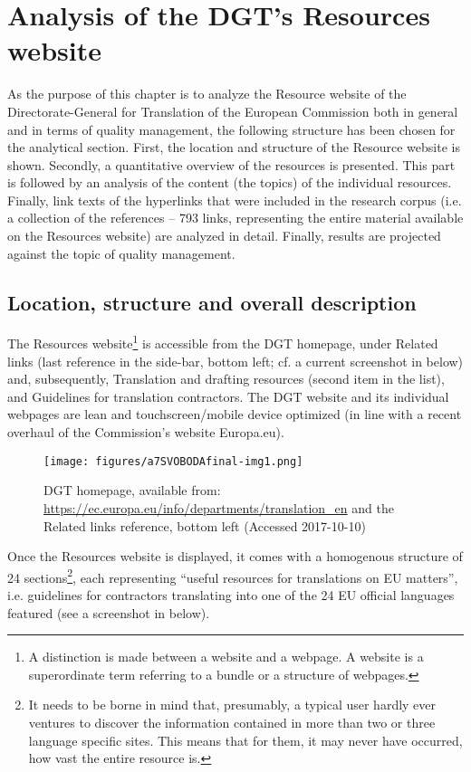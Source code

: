\documentclass[output=paper]{langsci/langscibook}
\begin{document}
\section{Analysis of the DGT’s Resources website}\label{sec:svoboda:4}

As the purpose of this chapter is to analyze the Resource website of the Directorate-General for Translation of the European Commission both in general and in terms of quality management, the following structure has been chosen for the analytical section. First, the location and structure of the Resource website is shown. Secondly, a quantitative overview of the resources is presented. This part is followed by an analysis of the content (the topics) of the individual resources. Finally, link texts of the hyperlinks that were included in the research corpus (i.e. a collection of the references – 793 links, representing the entire material available on the Resources website) are analyzed in detail. Finally, results are projected against the topic of quality management.

\subsection{Location, structure and overall description}\label{sec:svoboda:4.1}

 
The Resources website\footnote{A distinction is made between a website and a webpage. A website is a superordinate term referring to a bundle or a structure of webpages.} is accessible from the DGT homepage, under Related links (last reference in the side-bar, bottom left; cf. a current screenshot in  below) and, subsequently, Translation and drafting resources (second item in the list), and Guidelines for translation contractors. The DGT website and its individual webpages are lean and touchscreen/mobile device optimized (in line with a recent overhaul of the Commission’s website Europa.eu). 

\begin{figure}
\caption{DGT homepage, available from: \url{https://ec.europa.eu/info/departments/translation_en} and the Related links reference, bottom left (Accessed 2017-10-10)}
\label{fig:svoboda:1}
\texttt{[image: figures/a7SVOBODAfinal-img1.png]}
\end{figure}

 

\largerpage
Once the Resources website is displayed, it comes with a homogenous structure of 24 sections\footnote{It needs to be borne in mind that, presumably, a typical user hardly ever ventures to discover the information contained in more than two or three language specific sites. This means that for them, it may never have occurred, how vast the entire resource is.}, each representing “useful resources for translations on EU matters”, i.e. guidelines for contractors translating into one of the 24 EU official languages featured (see a screenshot in  below).
\end{document}
